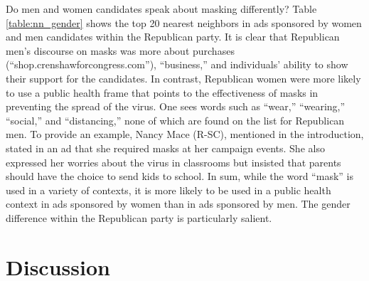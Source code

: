 {Do men and women candidates speak about masking differently?  Table \ref{table:nn_gender} shows the top 20 nearest neighbors in ads sponsored by women and men candidates within the Republican party. It is clear that Republican men's discourse on masks was more about purchases (``shop.crenshawforcongress.com''), ``business,'' and individuals' ability to show their support for the candidates. In contrast, Republican women were more likely to use a public health frame that points to the effectiveness of masks in preventing the spread of the virus.  One sees words such as ``wear,'' ``wearing,'' ``social,'' and ``distancing,''  none of which are found on the list for Republican men.  To provide an example, Nancy Mace (R-SC), mentioned in the introduction, stated in an ad that she required masks at her campaign events. She also expressed her worries about the virus in classrooms but insisted that parents should have the choice to send kids to school. In sum, while the word ``mask'' is used in a variety of contexts, it is more likely to be used in a public health context in ads sponsored by women than in ads sponsored by men. The gender difference within the Republican party is particularly salient.  



\begin{table}[!htbp]
\caption{Top 20 Nearest Neighbors for the Target Term ``Mask'' by Candidates' Party}
    \centering
    
\label{table:nn_party}
\end{table}

\begin{table}[!htbp]
    \caption{Top 20 nearest neighbors for the target term {\tt mask} by candidates' gender}
    \centering
    
    \label{table:nn_gender}
\end{table}

\begin{table}[!htbp]
    \caption{Top 20 nearest neighbors for the target term {\tt mask} by candidates' gender within the Republican party}
    \centering
    
    \label{table:nn_party_gender}
\end{table}




\section*{Discussion}

}
